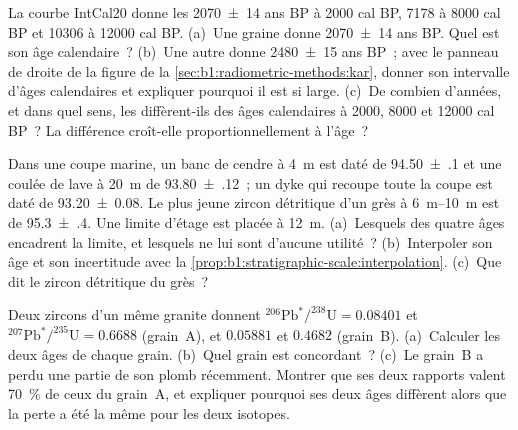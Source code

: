 \begin{exercise}[$\star\star$]\label{exo:b1:radiometric-methods:7}
La courbe IntCal20 donne les  \num[uncertainty-mode=separate]{2070 \pm 14} ans BP à \num{2000}
cal BP, \num{7178} à \num{8000} cal BP et \num{10306} à \num{12000} cal BP.
(a)~Une graine donne \num[uncertainty-mode=separate]{2070 \pm 14} ans BP. Quel est son
âge calendaire~? (b)~Une autre donne \num[uncertainty-mode=separate]{2480 \pm 15} ans
BP~; avec le panneau de droite de la figure de la
\cref{sec:b1:radiometric-methods:kar}, donner son intervalle d'âges calendaires et expliquer
pourquoi il est si large. (c)~De combien d'années, et dans quel sens, les 
diffèrent-ils des âges calendaires à \num{2000}, \num{8000} et \num{12000} cal BP~?
La différence croît-elle proportionnellement à l'âge~?
\end{exercise}

\begin{exercise}[$\star\star$]\label{exo:b1:radiometric-methods:8}
Dans une coupe marine, un banc de cendre à \qty{4}{m} est daté de
\qty[uncertainty-mode=separate]{94.50(10)}{\Ma} et une coulée de lave à \qty{20}{m} de
\qty[uncertainty-mode=separate]{93.80(12)}{\Ma}~; un dyke qui recoupe toute la
coupe est daté de \qty[uncertainty-mode=separate]{93.20(8)}{\Ma}. Le plus jeune
zircon détritique d'un grès à \qtyrange{6}{10}{m} est de
\qty[uncertainty-mode=separate]{95.3(4)}{\Ma}. Une limite d'étage est placée à
\qty{12}{m}. (a)~Lesquels des quatre âges encadrent la limite, et lesquels ne lui sont d'aucune
utilité~? (b)~Interpoler son âge et son incertitude avec la
\cref{prop:b1:stratigraphic-scale:interpolation}. (c)~Que dit le zircon
détritique du grès~?
\end{exercise}

\begin{exercise}[$\star\star$]\label{exo:b1:radiometric-methods:9}
Deux zircons d'un même granite donnent
$^{206}\mathrm{Pb}^*/^{238}\mathrm{U} = 0.08401$ et
$^{207}\mathrm{Pb}^*/^{235}\mathrm{U} = 0.6688$ (grain~A), et $0.05881$ et
$0.4682$ (grain~B). (a)~Calculer les deux âges de chaque grain. (b)~Quel grain est
concordant~? (c)~Le grain~B a perdu une partie de son plomb récemment. Montrer que ses deux
rapports valent \qty{70}{\percent} de ceux du grain~A, et expliquer pourquoi ses deux âges
diffèrent alors que la perte a été la même pour les deux isotopes.
\end{exercise}

